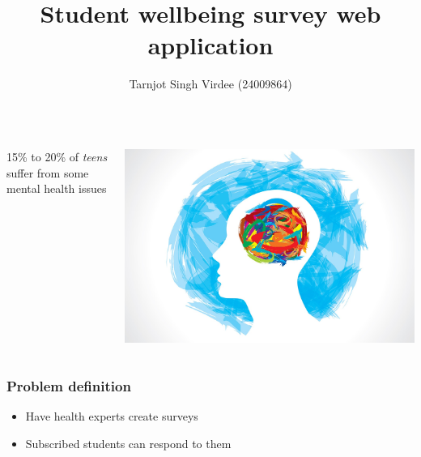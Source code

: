\documentclass{beamer}
\title{Student wellbeing survey web application}
\author{Tarnjot Singh Virdee (24009864)}
\begin{document}
\maketitle

\begin{frame}
\begin{columns}
    15\% to 20\% of \emph{teens} suffer from some mental health issues

    \includegraphics[height=1\textheight]{images/Mental-Health-1.jpg}

\end{columns}
\end{frame}

\begin{frame}
    \frametitle{Problem definition}
    \begin{itemize}
        \pause
        \item Have health experts create surveys 
        \pause
        \item Subscribed students can respond to them 
    \end{itemize}  
\end{frame}  
\end{document}
